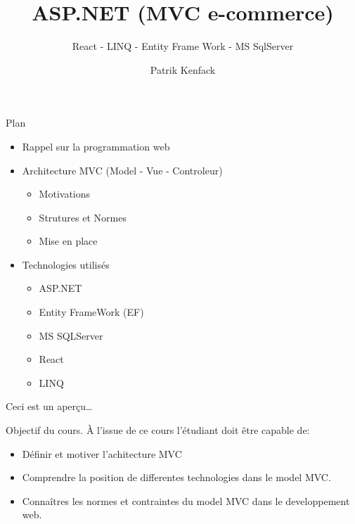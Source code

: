 \documentclass[
  ignorenonframetext,
]{beamer}
\title{ASP.NET (MVC e-commerce)}
\subtitle{React - LINQ - Entity Frame Work - MS SqlServer}
\author{Patrik Kenfack}
\date{}
\providecommand{\tightlist}{%
  \setlength{\itemsep}{0pt}\setlength{\parskip}{0pt}}\usepackage{longtable,booktabs,array}
\begin{document}
\frame{\titlepage}

\begin{frame}
\begin{block}{Plan}
\label{plan}
\begin{itemize}
\tightlist
\item
  Rappel sur la programmation web
\item
  Architecture MVC (Model - Vue - Controleur)

  \begin{itemize}
  \tightlist
  \item
    Motivations
  \item
    Strutures et Normes
  \item
    Mise en place
  \end{itemize}
\item
  Technologies utilisés

  \begin{itemize}
  \tightlist
  \item
    ASP.NET
  \item
    Entity FrameWork (EF)
  \item
    MS SQLServer
  \item
    React
  \item
    LINQ
  \end{itemize}
\end{itemize}
\end{block}
\end{frame}

\begin{frame}{Ceci est un aperçu\ldots{}}
\label{ceci-est-un-aperuxe7u}
\end{frame}

\begin{frame}{Objectif du cours.}
\label{objectif-du-cours.}
À l'issue de ce cours l'étudiant doit être capable de:

\begin{itemize}
\tightlist
\item
  Définir et motiver l'achitecture MVC
\item
  Comprendre la position de differentes technologies dans le model MVC.
\item
  Connaîtres les normes et contraintes du model MVC dans le
  developpement web.
\end{itemize}
\end{frame}
\end{document}

